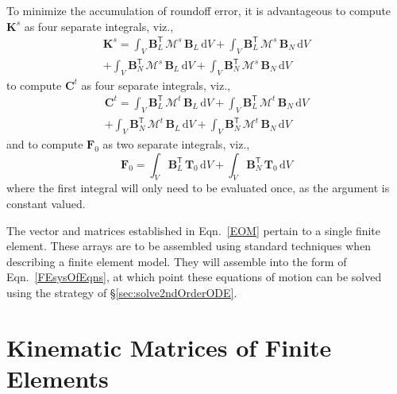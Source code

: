 To minimize the accumulation of roundoff error, it is advantageous to compute $\mathbf{K}^s$ as four separate integrals, viz.,
\begin{multline*}
\mathbf{K}^s = \int_V \mathbf{B}_L^{\mathsf{T}} \, 
\boldsymbol{\mathcal{M}}^s \, \mathbf{B}_L \, \mathrm{d}V + 
\int_V \mathbf{B}_L^{\mathsf{T}} \, \boldsymbol{\mathcal{M}}^s \, 
\mathbf{B}_N \, \mathrm{d}V \\ + 
\int_V \mathbf{B}_N^{\mathsf{T}} \, \boldsymbol{\mathcal{M}}^s \, 
\mathbf{B}_L \, \mathrm{d}V + 
\int_V \mathbf{B}_N^{\mathsf{T}} \, \boldsymbol{\mathcal{M}}^s \, 
\mathbf{B}_N \, \mathrm{d}V
\end{multline*}
to compute $\mathbf{C}^t$ as four separate integrals, viz.,
\begin{multline*}
\mathbf{C}^t = \int_V \mathbf{B}_L^{\mathsf{T}} \, 
\boldsymbol{\mathcal{M}}^t \, \mathbf{B}_L \, \mathrm{d}V + 
\int_V \mathbf{B}_L^{\mathsf{T}} \, \boldsymbol{\mathcal{M}}^t \, 
\mathbf{B}_N \, \mathrm{d}V \\ + 
\int_V \mathbf{B}_N^{\mathsf{T}} \, \boldsymbol{\mathcal{M}}^t \, 
\mathbf{B}_L \, \mathrm{d}V + 
\int_V \mathbf{B}_N^{\mathsf{T}} \, \boldsymbol{\mathcal{M}}^t \, 
\mathbf{B}_N \, \mathrm{d}V
\end{multline*}
and to compute $\boldsymbol{F}_0$ as two separate integrals, viz.,
\begin{equation*}
    \boldsymbol{F}_0 = \int_V \mathbf{B}_L^{\mathsf{T}} \, 
        \boldsymbol{T}_0 \, \mathrm{d}V + 
        \int_V \mathbf{B}_N^{\mathsf{T}} \, 
        \boldsymbol{T}_0 \, \mathrm{d}V 
\end{equation*}
where the first integral will only need to be evaluated once, as the argument is constant valued.

The vector and matrices established in Eqn.~\eqref{EOM} pertain to a single finite element.  These arrays are to be assembled using standard techniques \cite{ClaytonChung18} when describing a finite element model.  They will assemble into the form of Eqn.~\eqref{FEsysOfEqns}, at which point these equations of motion can be solved using the strategy of \S\ref{sec:solve2ndOrderODE}.


\section{Kinematic Matrices of Finite Elements}

